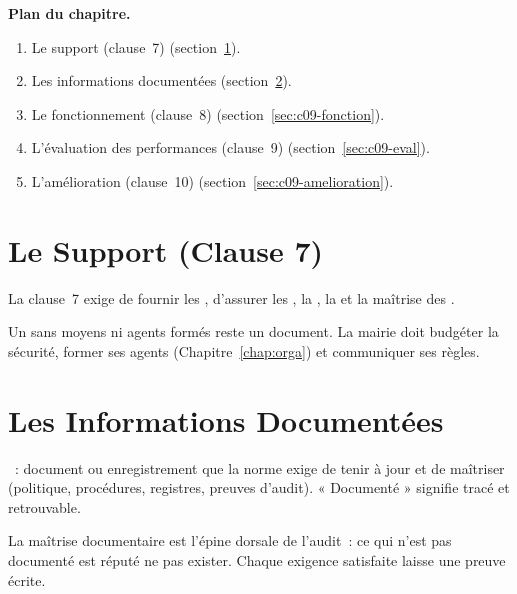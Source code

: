 \medskip
\textbf{Plan du chapitre.}
\begin{enumerate}
    \item Le support (clause~7) (section~\ref{sec:c09-support}).
    \item Les informations documentées (section~\ref{sec:c09-doc}).
    \item Le fonctionnement (clause~8) (section~\ref{sec:c09-fonction}).
    \item L'évaluation des performances (clause~9) (section~\ref{sec:c09-eval}).
    \item L'amélioration (clause~10) (section~\ref{sec:c09-amelioration}).
\end{enumerate}

\separateur

\section{Le Support (Clause 7)}
\label{sec:c09-support}

\begin{boxdef}
La clause~7 exige de fournir les , d'assurer les
, la , la 
et la maîtrise des .
\end{boxdef}

Un  sans moyens ni agents formés reste un document. La mairie doit
budgéter la sécurité, former ses agents (Chapitre~\ref{chap:orga}) et
communiquer ses règles.

\section{Les Informations Documentées}
\label{sec:c09-doc}

\begin{boxdef}
~: document ou enregistrement que la norme
exige de tenir à jour et de maîtriser (politique, procédures, registres,
preuves d'audit). « Documenté » signifie tracé et retrouvable.
\end{boxdef}

La maîtrise documentaire est l'épine dorsale de l'audit~: ce qui n'est pas
documenté est réputé ne pas exister. Chaque exigence satisfaite laisse une
preuve écrite.

